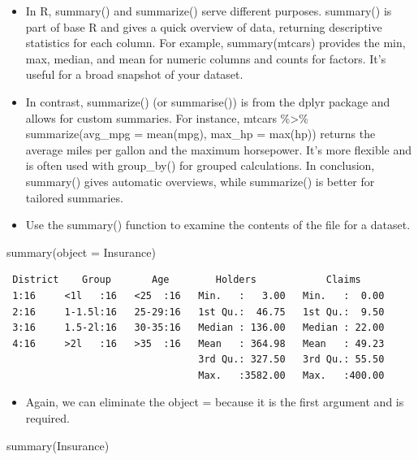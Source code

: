 \documentclass[
  letterpaper,
  DIV=11,
  numbers=noendperiod]{scrreprt}
\newenvironment{Shaded}{\begin{snugshade}}{\end{snugshade}}
\newcommand{\AttributeTok}[1]{\textcolor[rgb]{0.40,0.45,0.13}{#1}}
\newcommand{\FunctionTok}[1]{\textcolor[rgb]{0.28,0.35,0.67}{#1}}
\newcommand{\NormalTok}[1]{\textcolor[rgb]{0.00,0.23,0.31}{#1}}
\providecommand{\tightlist}{%
  \setlength{\itemsep}{0pt}\setlength{\parskip}{0pt}}\usepackage{longtable,booktabs,array}
\begin{document}
\begin{itemize}
\item
  In R, summary() and summarize() serve different purposes. summary() is
  part of base R and gives a quick overview of data, returning
  descriptive statistics for each column. For example, summary(mtcars)
  provides the min, max, median, and mean for numeric columns and counts
  for factors. It's useful for a broad snapshot of your dataset.
\item
  In contrast, summarize() (or summarise()) is from the dplyr package
  and allows for custom summaries. For instance, mtcars \%\textgreater\%
  summarize(avg\_mpg = mean(mpg), max\_hp = max(hp)) returns the average
  miles per gallon and the maximum horsepower. It's more flexible and is
  often used with group\_by() for grouped calculations. In conclusion,
  summary() gives automatic overviews, while summarize() is better for
  tailored summaries.
\item
  Use the summary() function to examine the contents of the file for a
  dataset.
\end{itemize}

\begin{Shaded}
\begin{Highlighting}[]
\FunctionTok{summary}\NormalTok{(}\AttributeTok{object =}\NormalTok{ Insurance)}
\end{Highlighting}
\end{Shaded}

\begin{verbatim}
 District    Group       Age        Holders            Claims      
 1:16     <1l   :16   <25  :16   Min.   :   3.00   Min.   :  0.00  
 2:16     1-1.5l:16   25-29:16   1st Qu.:  46.75   1st Qu.:  9.50  
 3:16     1.5-2l:16   30-35:16   Median : 136.00   Median : 22.00  
 4:16     >2l   :16   >35  :16   Mean   : 364.98   Mean   : 49.23  
                                 3rd Qu.: 327.50   3rd Qu.: 55.50  
                                 Max.   :3582.00   Max.   :400.00  
\end{verbatim}

\begin{itemize}
\tightlist
\item
  Again, we can eliminate the object = because it is the first argument
  and is required.
\end{itemize}

\begin{Shaded}
\begin{Highlighting}[]
\FunctionTok{summary}\NormalTok{(Insurance)}
\end{Highlighting}
\end{Shaded}
\end{document}
